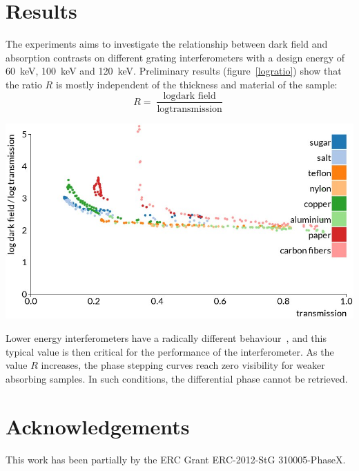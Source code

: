 \documentclass[a4paper, english]{article}
\newenvironment{multicolfigure}
  {\par\medskip\noindent\minipage{\linewidth}}
  {\endminipage\par\medskip}
\begin{document}
\begin{multicols}{2}
    \section{Results}
    The experiments aims to investigate the relationship between dark field
    and absorption contrasts on different grating interferometers with a
    design energy of \SI{60}{\kilo\eV}, \SI{100}{\kilo\eV} and
    \SI{120}{\kilo\eV}. Preliminary results (figure~\ref{logratio}) show
    that the ratio $R$ is mostly independent of
    the thickness and material of the sample:
    \begin{equation*}
        R = \frac{\log\text{dark field}}{\log\text{transmission}}
    \end{equation*}
    \begin{multicolfigure}
    \includegraphics[width=.95\columnwidth]{figures/logratio.jpg}
        \label{logratio}
    \end{multicolfigure}
    Lower energy interferometers have a radically different
    behaviour~\supercite{Wang2014}, and
    this typical value is then critical for the performance of the
    interferometer. As the value $R$ increases, the phase stepping curves
    reach zero visibility for weaker absorbing samples. In such conditions,
    the differential phase cannot be retrieved.

    \section{Acknowledgements}
    This work has been partially by the ERC Grant ERC-2012-StG 310005-PhaseX.
    \printbibliography{}

\end{multicols}
\end{document}
